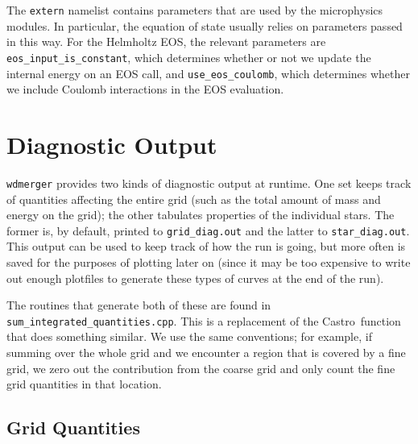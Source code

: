 \documentclass[12pt]{book}
\newcommand{\castro}{{\sf Castro}}
\begin{document}
The \texttt{extern} namelist contains parameters that are used by the microphysics modules. In particular, 
the equation of state usually relies on parameters passed in this way. For the Helmholtz EOS, the relevant 
parameters are \texttt{eos\_input\_is\_constant}, which determines whether or not we update the internal 
energy on an EOS call, and \texttt{use\_eos\_coulomb}, which determines whether we include Coulomb 
interactions in the EOS evaluation.



\section{Diagnostic Output}

\texttt{wdmerger} provides two kinds of diagnostic output at runtime. One set keeps track of quantities affecting 
the entire grid (such as the total amount of mass and energy on the grid); the other tabulates properties 
of the individual stars. The former is, by default, printed to \texttt{grid\_diag.out} and the latter to 
\texttt{star\_diag.out}. This output can be used to keep track of how the run is going, but more often is 
saved for the purposes of plotting later on (since it may be too expensive to write out enough plotfiles to 
generate these types of curves at the end of the run).

The routines that generate both of these are found in \\\texttt{sum\_integrated\_quantities.cpp}. 
This is a replacement of the \castro\ function that does something similar. We use the same 
conventions; for example, if summing over the whole grid and we encounter a region that is covered by 
a fine grid, we zero out the contribution from the coarse grid and only count the fine grid quantities 
in that location.

\subsection{Grid Quantities}
\end{document}
